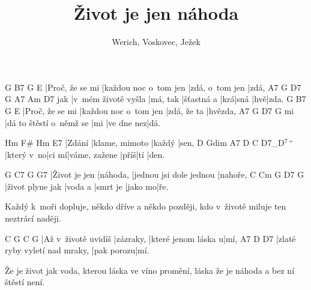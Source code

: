 \documentclass{song}
\title{Život je jen náhoda}
\author{Werich, Voskovec, Ježek}
\newcommand{\+}{$^{7+}$}
\begin{document}
\strophe
G               B7                    G               E
|Proč, že se mi |každou noc o~tom jen |zdá, o~tom jen |zdá,
    A7                  G        D7         G   A7   Am  D7
jak |v~mém životě vyšla |má, tak |šťastná a |krá|sná |hvě|zda.
G               B7                    G           E
|Proč, že se mi |každou noc o~tom jen |zdá, že ta |hvězda,
   A7                      G   D7         G
mi |dá to štěstí o~němž se |mi |ve dne nez|dá.
\endstrophe

\strophe
Hm     F#             Hm     E7
|Zdání |klame, mimoto |každý |sen,
D          Gdim  A7            D    C   D7_D\+
|který v~no|ci mí|váme, zažene |příš|tí |den.
\endstrophe


G             C7       G                       G7
|Život je jen |náhoda, |jednou jsi dole jednou |nahoře,
C                Cm      G        D7      G
|život plyne jak |voda a |smrt je |jako mo|ře.
\endstrophe

Každý k~moři dopluje, někdo dříve a někdo později,
kdo v~životě miluje ten neztrácí naději.
\endstrophe

\strophe
C                   G         C                   G
|Až v~životě uvidíš |zázraky, |které jenom láska u|mí,
A7                            D          D7
|zlaté ryby vyletí nad mraky, |pak porozu|mí.
\endstrophe

Že je život jak voda, kterou láska ve víno promění,
láska že je náhoda a bez ní štěstí není.
\endstrophe
\end{document}
